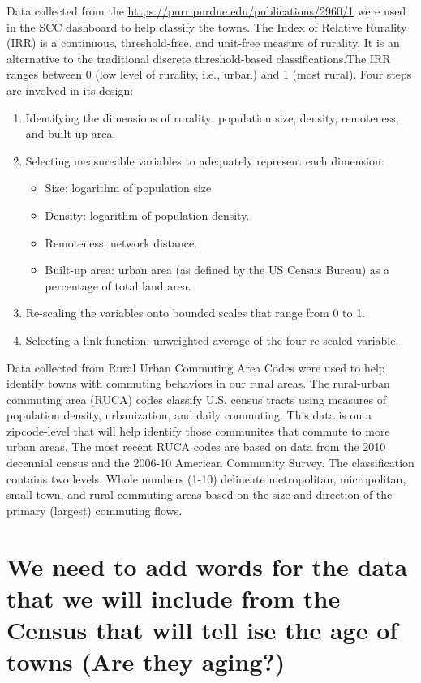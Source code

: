 \documentclass[letterpaper,inpress]{jdsart}
\begin{document}
Data collected from the \url{https://purr.purdue.edu/publications/2960/1} were used in the SCC dashboard to help classify the towns. The Index of Relative Rurality (IRR) is a continuous, threshold-free, and unit-free measure of rurality. It is an alternative to the traditional discrete threshold-based classifications.The IRR ranges between 0 (low level of rurality, i.e., urban) and 1 (most rural). Four steps are involved in its design:

\begin{enumerate}
\item Identifying the dimensions of rurality: population size, density, remoteness, and built-up area.
\item Selecting measureable variables to adequately represent each dimension:
    \begin{itemize}
        \item Size: logarithm of population size
        \item Density: logarithm of population density.
        \item Remoteness: network distance.
        \item Built-up area: urban area (as defined by the US Census Bureau) as a percentage of total land area.
    \end{itemize}
\item Re-scaling the variables onto bounded scales that range from 0 to 1.
\item Selecting a link function: unweighted average of the four re-scaled variable.
\end{enumerate}

Data collected from Rural Urban Commuting Area Codes \cite{usda} were used to help identify towns with commuting behaviors in our rural areas. The rural-urban commuting area (RUCA) codes classify U.S. census tracts using measures of population density, urbanization, and daily commuting. This data is on a zipcode-level that will help identify those communites that commute to more urban areas. The most recent RUCA codes are based on data from the 2010 decennial census and the 2006-10 American Community Survey. The classification contains two levels. Whole numbers (1-10) delineate metropolitan, micropolitan, small town, and rural commuting areas based on the size and direction of the primary (largest) commuting flows.

\hypertarget{we-need-to-add-words-for-the-data-that-we-will-include-from-the-census-that-will-tell-ise-the-age-of-towns-are-they-aging}{%
\section{We need to add words for the data that we will include from the Census that will tell ise the age of towns (Are they aging?)}\label{we-need-to-add-words-for-the-data-that-we-will-include-from-the-census-that-will-tell-ise-the-age-of-towns-are-they-aging}}
\end{document}
